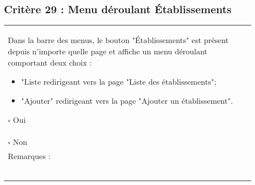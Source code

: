   		
  			\subsection*{Critère 29 : Menu déroulant Établissements}
	
	\begin{center}
    	 		\begin{tabular}[h]{|p{}|}
			\hline
				Dans la barre des menus, le bouton "Établissements" est présent depuis n'importe quelle page et affiche un menu déroulant comportant deux choix :   
				\begin{itemize}
					\item "Liste redirigeant vers la page "Liste des établissements";
					\item "Ajouter" redirigeant vers la page "Ajouter un établissement".
				\end{itemize}
				$\square$ Oui  \\ $\square$ Non \\\hline Remarques : \\ ~\\
			 \\\hline
     		\end{tabular}
  		\end{center}
  		
  		
  	